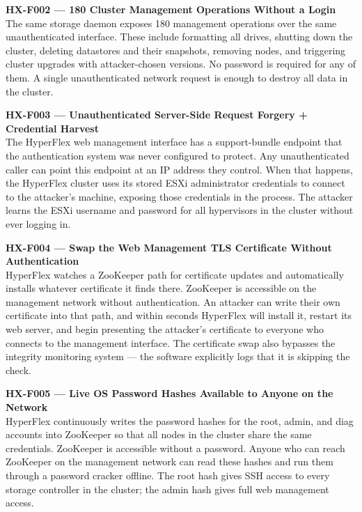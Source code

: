 \documentclass[11pt,a4paper]{article}
\begin{document}
\medskip
\textbf{HX-F002 --- 180 Cluster Management Operations Without a Login}\\
The same storage daemon exposes 180 management operations over the same
unauthenticated interface. These include formatting all drives, shutting down
the cluster, deleting datastores and their snapshots, removing nodes, and
triggering cluster upgrades with attacker-chosen versions. No password is
required for any of them. A single unauthenticated network request is enough
to destroy all data in the cluster.

\medskip
\textbf{HX-F003 --- Unauthenticated Server-Side Request Forgery + Credential Harvest}\\
The HyperFlex web management interface has a support-bundle endpoint that the
authentication system was never configured to protect. Any unauthenticated
caller can point this endpoint at an IP address they control. When that happens,
the HyperFlex cluster uses its stored ESXi administrator credentials to connect
to the attacker's machine, exposing those credentials in the process. The
attacker learns the ESXi username and password for all hypervisors in the
cluster without ever logging in.

\medskip
\textbf{HX-F004 --- Swap the Web Management TLS Certificate Without Authentication}\\
HyperFlex watches a ZooKeeper path for certificate updates and automatically
installs whatever certificate it finds there. ZooKeeper is accessible on the
management network without authentication. An attacker can write their own
certificate into that path, and within seconds HyperFlex will install it,
restart its web server, and begin presenting the attacker's certificate to
everyone who connects to the management interface. The certificate swap also
bypasses the integrity monitoring system --- the software explicitly logs that it
is skipping the check.

\medskip
\textbf{HX-F005 --- Live OS Password Hashes Available to Anyone on the Network}\\
HyperFlex continuously writes the password hashes for the root, admin, and diag
accounts into ZooKeeper so that all nodes in the cluster share the same
credentials. ZooKeeper is accessible without a password. Anyone who can reach
ZooKeeper on the management network can read these hashes and run them through a
password cracker offline. The root hash gives SSH access to every storage
controller in the cluster; the admin hash gives full web management access.
\end{document}
